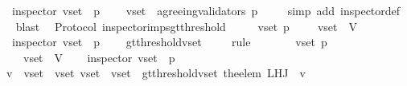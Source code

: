 \begin{isabellebody}
\ \ {\isasymlongrightarrow}\ inspector\ {\isacharparenleft}v{\isacharunderscore}set{\isacharcomma}\ {\isasymsigma}{\isacharcomma}\ p{\isacharparenright}\ \isanewline
\ \ {\isasymlongrightarrow}\ v{\isacharunderscore}set\ {\isasymsubseteq}\ agreeing{\isacharunderscore}validators\ {\isacharparenleft}p{\isacharcomma}\ {\isasymsigma}{\isacharparenright}{\isachardoublequoteclose}\isanewline
%
\isadelimproof
\ \ %
\endisadelimproof
%
\isatagproof
{}\isamarkupfalse%
\ {\isacharparenleft}simp\ add{\isacharcolon}\ inspector{\isacharunderscore}def{\isacharparenright}\isanewline
\ \ \isamarkupfalse%
\ blast%
\endisatagproof
{\isafoldproof}%
%
\isadelimproof
\isanewline
%
\endisadelimproof
\isanewline
{}\isamarkupfalse%
\ {\isacharparenleft}\ Protocol{\isacharparenright}\ inspector{\isacharunderscore}imps{\isacharunderscore}gt{\isacharunderscore}threshold\ {\isacharcolon}\isanewline
\ \ {\isachardoublequoteopen}{\isasymforall}\ {\isasymsigma}\ v{\isacharunderscore}set\ p{\isachardot}\ {\isasymsigma}\ {\isasymin}\ {\isasymSigma}\ {\isasymand}\ v{\isacharunderscore}set\ {\isasymsubseteq}\ V\ \isanewline
\ \ {\isasymlongrightarrow}\ inspector\ {\isacharparenleft}v{\isacharunderscore}set{\isacharcomma}\ {\isasymsigma}{\isacharcomma}\ p{\isacharparenright}\ \isanewline
\ \ {\isasymlongrightarrow}\ gt{\isacharunderscore}threshold{\isacharparenleft}v{\isacharunderscore}set{\isacharcomma}\ {\isasymsigma}{\isacharparenright}{\isachardoublequoteclose}\isanewline
%
\isadelimproof
\ \ %
\endisadelimproof
%
\isatagproof
{}\isamarkupfalse%
\ {\isacharparenleft}rule{\isacharplus}{\isacharparenright}\isanewline
{}\isamarkupfalse%
\ {\isacharminus}\ \isanewline
\ \ \isamarkupfalse%
\ {\isasymsigma}\ v{\isacharunderscore}set\ p\isanewline
\ \ \isamarkupfalse%
\ {\isachardoublequoteopen}{\isasymsigma}\ {\isasymin}\ {\isasymSigma}\ {\isasymand}\ v{\isacharunderscore}set\ {\isasymsubseteq}\ V{\isachardoublequoteclose}\isanewline
\ \ \isamarkupfalse%
\ {\isachardoublequoteopen}inspector\ {\isacharparenleft}v{\isacharunderscore}set{\isacharcomma}\ {\isasymsigma}{\isacharcomma}\ p{\isacharparenright}{\isachardoublequoteclose}\ \isanewline
\ \ \isamarkupfalse%
\ {\isachardoublequoteopen}{\isasymexists}\ v\ {\isasymin}\ v{\isacharunderscore}set{\isachardot}\ {\isasymexists}\ v{\isacharunderscore}set{\isacharprime}{\isachardot}\ v{\isacharunderscore}set{\isacharprime}\ {\isasymsubseteq}\ v{\isacharunderscore}set\ {\isasymand}\ gt{\isacharunderscore}threshold{\isacharparenleft}v{\isacharunderscore}set{\isacharprime}{\isacharcomma}\ the{\isacharunderscore}elem\ {\isacharparenleft}L{\isacharunderscore}H{\isacharunderscore}J\ {\isasymsigma}\ v{\isacharparenright}{\isacharparenright}{\isachardoublequoteclose}\isanewline

\end{isabellebody}
